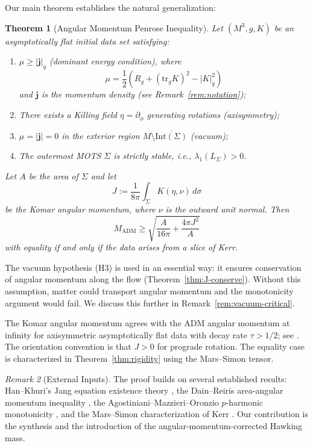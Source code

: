 \documentclass[12pt]{article}
\theoremstyle{plain}
\newtheorem{theorem}{Theorem}[section]
\theoremstyle{definition}
\theoremstyle{remark}
\newtheorem{remark}[theorem]{Remark}
\newcommand{\ADM}{\mathrm{ADM}}
\newcommand{\tr}{\mathrm{tr}}
\newcommand{\momdens}{\boldsymbol{j}}
\begin{document}
Our main theorem establishes the natural generalization:

\begin{theorem}[Angular Momentum Penrose Inequality]\label{thm:main}
Let $(M^3, g, K)$ be an asymptotically flat initial data set satisfying:
\begin{enumerate}[label=\textup{(H\arabic*)}]
    \item $\mu \geq |\momdens|_g$ (dominant energy condition), where 
    \[
    \mu = \frac{1}{2}(R_g + (\tr_g K)^2 - |K|_g^2)
    \]
    and $\momdens$ is the momentum density (see Remark~\ref{rem:notation});
    \item There exists a Killing field $\eta = \partial_\phi$ generating rotations (axisymmetry);
    \item $\mu = |\momdens| = 0$ in the exterior region $M \setminus \overline{\mathrm{Int}(\Sigma)}$ (vacuum);
    \item The outermost MOTS $\Sigma$ is strictly stable, i.e., $\lambda_1(L_\Sigma) > 0$.
\end{enumerate}
Let $A$ be the area of $\Sigma$ and let
\[
J := \frac{1}{8\pi} \int_\Sigma K(\eta, \nu) \, d\sigma
\]
be the Komar angular momentum, where $\nu$ is the outward unit normal. Then
\begin{equation}\label{eq:main}
    M_{\ADM} \geq \sqrt{\frac{A}{16\pi} + \frac{4\pi J^2}{A}}
\end{equation}
with equality if and only if the data arises from a slice of Kerr.
\end{theorem}

The vacuum hypothesis (H3) is used in an essential way: it ensures conservation of angular momentum along the flow (Theorem~\ref{thm:J-conserve}). Without this assumption, matter could transport angular momentum and the monotonicity argument would fail. We discuss this further in Remark~\ref{rem:vacuum-critical}.

The Komar angular momentum agrees with the ADM angular momentum at infinity for axisymmetric asymptotically flat data with decay rate $\tau > 1/2$; see \cite{chrusciel2008, mars2009}. The orientation convention is that $J > 0$ for prograde rotation. The equality case is characterized in Theorem~\ref{thm:rigidity} using the Mars--Simon tensor.

\begin{remark}[External Inputs]
The proof builds on several established results: Han--Khuri's Jang equation existence theory \cite{hankhuri2013}, the Dain--Reiris area-angular momentum inequality \cite{dain2011}, the Agostiniani--Mazzieri--Oronzio $p$-harmonic monotonicity \cite{amo2022}, and the Mars--Simon characterization of Kerr \cite{mars1999, simon1984}. Our contribution is the synthesis and the introduction of the angular-momentum-corrected Hawking mass.
\end{remark}
\end{document}
